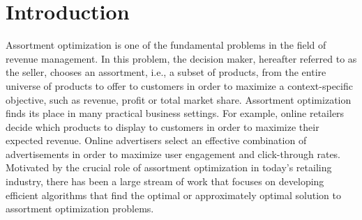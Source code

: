 \documentclass[mnsc,non-blindrev]{informs3}
\theoremstyle{definition}
\begin{document}
%

\section{Introduction}

Assortment optimization is one of the fundamental problems in the field of revenue management. In this problem, the decision maker, hereafter referred to as the seller, chooses an assortment, i.e., a subset of products, from the entire universe of products to offer to customers in order to maximize a context-specific objective, such as revenue, profit or total market share. Assortment optimization finds its place in many practical business settings. For example, online retailers decide which products to display to customers in order to maximize their expected revenue. Online advertisers select an effective combination of advertisements in order to maximize user engagement and click-through rates. Motivated by the crucial role of assortment optimization in today's retailing industry, there has been a large stream of work that focuses on developing efficient algorithms that find the optimal or approximately optimal solution to assortment optimization problems.
\end{document}
